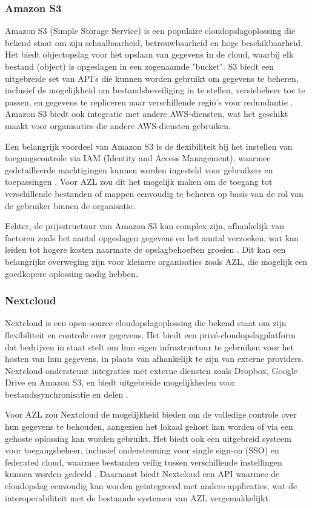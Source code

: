 \subsubsection{Amazon S3}
Amazon S3 (Simple Storage Service) is een populaire cloudopslagoplossing die bekend staat om zijn schaalbaarheid, betrouwbaarheid en hoge beschikbaarheid. Het biedt objectopslag voor het opslaan van gegevens in de cloud, waarbij elk bestand (object) is opgeslagen in een zogenaamde "bucket". S3 biedt een uitgebreide set van API's die kunnen worden gebruikt om gegevens te beheren, inclusief de mogelijkheid om bestandsbeveiliging in te stellen, versiebeheer toe te passen, en gegevens te repliceren naar verschillende regio's voor redundantie \autocite{aws_s3}. Amazon S3 biedt ook integratie met andere AWS-diensten, wat het geschikt maakt voor organisaties die andere AWS-diensten gebruiken.

Een belangrijk voordeel van Amazon S3 is de flexibiliteit bij het instellen van toegangscontrole via IAM (Identity and Access Management), waarmee gedetailleerde machtigingen kunnen worden ingesteld voor gebruikers en toepassingen \autocite{aws_iam}. Voor AZL zou dit het mogelijk maken om de toegang tot verschillende bestanden of mappen eenvoudig te beheren op basis van de rol van de gebruiker binnen de organisatie.

Echter, de prijsstructuur van Amazon S3 kan complex zijn, afhankelijk van factoren zoals het aantal opgeslagen gegevens en het aantal verzoeken, wat kan leiden tot hogere kosten naarmate de opslagbehoeften groeien \autocite{aws_pricing}. Dit kan een belangrijke overweging zijn voor kleinere organisaties zoals AZL, die mogelijk een goedkopere oplossing nodig hebben.

\subsubsection{Nextcloud}
Nextcloud is een open-source cloudopslagoplossing die bekend staat om zijn flexibiliteit en controle over gegevens. Het biedt een privé-cloudopslagplatform dat bedrijven in staat stelt om hun eigen infrastructuur te gebruiken voor het hosten van hun gegevens, in plaats van afhankelijk te zijn van externe providers. Nextcloud ondersteunt integraties met externe diensten zoals Dropbox, Google Drive en Amazon S3, en biedt uitgebreide mogelijkheden voor bestandssynchronisatie en delen \autocite{nextcloud_features}.

Voor AZL zou Nextcloud de mogelijkheid bieden om de volledige controle over hun gegevens te behouden, aangezien het lokaal gehost kan worden of via een gehoste oplossing kan worden gebruikt. Het biedt ook een uitgebreid systeem voor toegangsbeheer, inclusief ondersteuning voor single sign-on (SSO) en federated cloud, waarmee bestanden veilig tussen verschillende instellingen kunnen worden gedeeld \autocite{nextcloud_sso}. Daarnaast biedt Nextcloud een API waarmee de cloudopslag eenvoudig kan worden geïntegreerd met andere applicaties, wat de interoperabiliteit met de bestaande systemen van AZL vergemakkelijkt.


